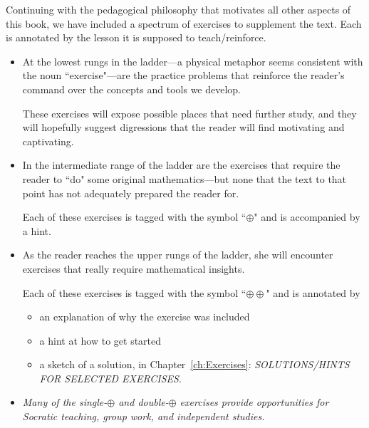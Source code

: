 Continuing with the pedagogical philosophy that motivates all other aspects of this book, we have included a spectrum of exercises to supplement the text.  Each is annotated by the lesson it is supposed to teach/reinforce.
\begin{itemize}
\item
At the lowest rungs in the ladder---a physical metaphor seems consistent with the noun ``exercise"---are the practice problems that reinforce the reader's command over the concepts and tools we develop.

These exercises will expose possible places that need further study, and they will hopefully suggest digressions that the reader will find motivating and captivating.

\medskip\item
In the intermediate range of the ladder are the exercises that require the reader to ``do" some original mathematics---but none that the text to that point has not adequately prepared the reader for. 

Each of these exercises is tagged with the symbol ``$\oplus$" and is accompanied by a hint.

\medskip\item
As the reader reaches the upper rungs of the ladder, she will encounter exercises that really require mathematical insights.

Each of these exercises is tagged with the symbol ``$\oplus \oplus$" and is annotated by
  \begin{itemize}
  \item
an explanation of why the exercise was included
  \medskip\item
a hint at how to get started
  \medskip\item
a sketch of a solution, in Chapter~\ref{ch:Exercises}: {\it SOLUTIONS/HINTS FOR SELECTED EXERCISES}.
  \end{itemize} 

\medskip\item
{\em Many of the single-$\oplus$ and double-$\oplus$ exercises provide opportunities for Socratic teaching, group work, and independent studies.} 

\bigskip

\noindent {}
\end{itemize}


